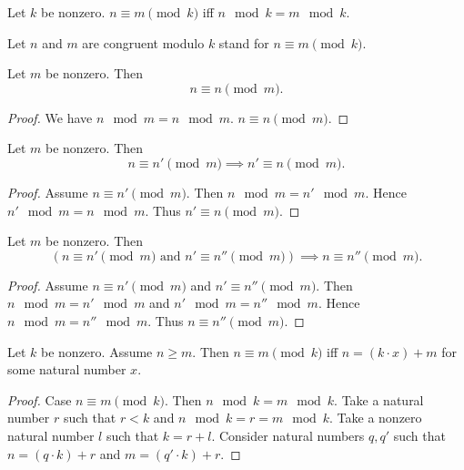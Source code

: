 \documentclass[../../arithmetic.ftl.tex]{subfiles}
\begin{document}
  \begin{forthel}
    \begin{definition}
      Let $k$ be nonzero.
      $n \equiv m \pmod{k}$ iff $n \mod k = m \mod k$.
    \end{definition}

    Let $n$ and $m$ are congruent modulo $k$ stand for $n \equiv m \pmod{k}$.

    \begin{proposition}\label{Arithmetic_03_03_188421}
      Let $m$ be nonzero.
      Then \[ n \equiv n \pmod{m}. \]
    \end{proposition}
    \begin{proof}
      We have $n \mod m = n \mod m$.
      $n \equiv n \pmod{m}$.
    \end{proof}

    \begin{proposition}\label{Arithmetic_03_03_880545}
      Let $m$ be nonzero.
      Then \[ n \equiv n' \pmod{m} \implies n' \equiv n \pmod{m}. \]
    \end{proposition}
    \begin{proof}
      Assume $n \equiv n' \pmod{m}$.
      Then $n \mod m = n' \mod m$.
      Hence $n' \mod m = n \mod m$.
      Thus $n' \equiv n \pmod{m}$.
    \end{proof}

    \begin{proposition}\label{Arithmetic_03_03_310316}
      Let $m$ be nonzero.
      Then \[ (\text{$n \equiv n' \pmod{m}$ and $n' \equiv n'' \pmod{m}$}) \implies n \equiv n'' \pmod{m}. \]
    \end{proposition}
    \begin{proof}
      Assume $n \equiv n' \pmod{m}$ and $n' \equiv n'' \pmod{m}$.
      Then $n \mod m = n' \mod m$ and $n' \mod m = n'' \mod m$.
      Hence $n \mod m = n'' \mod m$.
      Thus $n \equiv n'' \pmod{m}$.
    \end{proof}

    \begin{proposition}\label{Arithmetic_03_03_376294}
      Let $k$ be nonzero.
      Assume $n \geq m$.
      Then $n \equiv m \pmod{k}$ iff $n = (k \cdot x) + m$ for some natural number $x$.
    \end{proposition}
    \begin{proof}
      Case $n \equiv m \pmod{k}$.
        Then $n \mod k = m \mod k$.
        Take a natural number $r$ such that $r < k$ and $n \mod k = r = m \mod k$.
        Take a nonzero natural number $l$ such that $k = r + l$.
        Consider natural numbers $q,q'$ such that $n = (q \cdot k) + r$ and $m = (q' \cdot k) + r$.


\end{proof}
\end{forthel}
\end{document}
